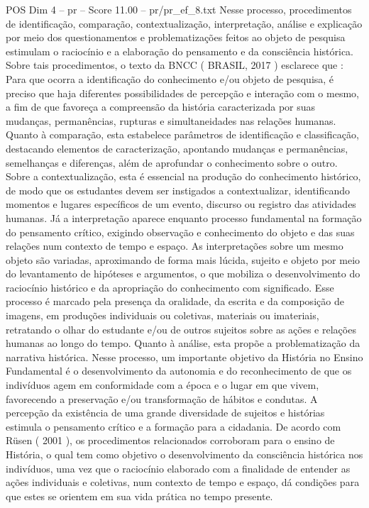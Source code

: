 \begin{textsample}{POS Dim 4 – pr – Score 11.00 – pr/pr\_ef\_8.txt}
Nesse processo, procedimentos de identificação, comparação, contextualização, interpretação, análise e explicação por meio dos questionamentos e problematizações feitos ao objeto de pesquisa estimulam o raciocínio e a elaboração do pensamento e da consciência histórica.
Sobre tais procedimentos, o texto da BNCC ( BRASIL, 2017 ) esclarece que : Para que ocorra a identificação do conhecimento e/ou objeto de pesquisa, é preciso que haja diferentes possibilidades de percepção e interação com o mesmo, a fim de que favoreça a compreensão da história caracterizada por suas mudanças, permanências, rupturas e simultaneidades nas relações humanas.
Quanto à comparação, esta estabelece parâmetros de identificação e classificação, destacando elementos de caracterização, apontando mudanças e permanências, semelhanças e diferenças, além de aprofundar o conhecimento sobre o outro.
Sobre a contextualização, esta é essencial na produção do conhecimento histórico, de modo que os estudantes devem ser instigados a contextualizar, identificando momentos e lugares específicos de um evento, discurso ou registro das atividades humanas.
Já a interpretação aparece enquanto processo fundamental na formação do pensamento crítico, exigindo observação e conhecimento do objeto e das suas relações num contexto de tempo e espaço.
As interpretações sobre um mesmo objeto são variadas, aproximando de forma mais lúcida, sujeito e objeto por meio do levantamento de hipóteses e argumentos, o que mobiliza o desenvolvimento do raciocínio histórico e da apropriação do conhecimento com significado.
Esse processo é marcado pela presença da oralidade, da escrita e da composição de imagens, em produções individuais ou coletivas, materiais ou imateriais, retratando o olhar do estudante e/ou de outros sujeitos sobre as ações e relações humanas ao longo do tempo.
Quanto à análise, esta propõe a problematização da narrativa histórica.
Nesse processo, um importante objetivo da História no Ensino Fundamental é o desenvolvimento da autonomia e do reconhecimento de que os indivíduos agem em conformidade com a época e o lugar em que vivem, favorecendo a preservação e/ou transformação de hábitos e condutas.
A percepção da existência de uma grande diversidade de sujeitos e histórias estimula o pensamento crítico e a formação para a cidadania.
De acordo com Rüsen ( 2001 ), os procedimentos relacionados corroboram para o ensino de História, o qual tem como objetivo o desenvolvimento da consciência histórica nos indivíduos, uma vez que o raciocínio elaborado com a finalidade de entender as ações individuais e coletivas, num contexto de tempo e espaço, dá condições para que estes se orientem em sua vida prática no tempo presente.

\end{textsample}
